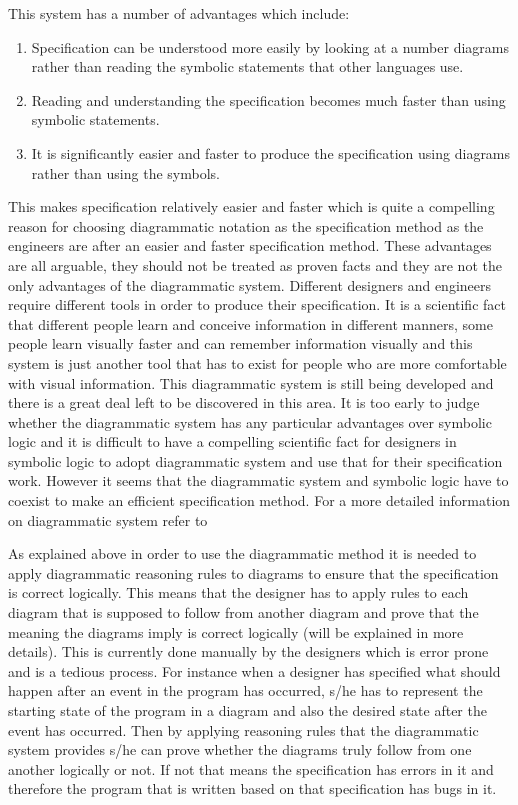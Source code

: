 \documentclass[a4paper]{article}
\begin{document}
This system has a number of advantages which include:
\begin{enumerate}
\item Specification can be understood more easily by looking at a number diagrams rather than reading the symbolic statements that other languages use.
\item Reading and understanding the specification becomes much faster than using symbolic statements.
\item It is significantly easier and faster to produce the specification using diagrams rather than using the symbols.
\end{enumerate}

This makes specification relatively easier and faster which is quite a compelling reason for choosing diagrammatic notation as the specification method as the engineers are after an easier and faster specification method. These advantages are all arguable, they should not be treated as proven facts and they are not the only advantages of the diagrammatic system. Different designers and engineers require different tools in order to produce their specification. It is a scientific fact that different people learn and conceive information in different manners, some people learn visually faster and can remember information visually and this system is just another tool that has to exist for people who are more comfortable with visual information. This diagrammatic system is still being developed and there is a great deal left to be discovered in this area. It is too early to judge whether the diagrammatic system has any particular advantages over symbolic logic and it is difficult to have a compelling scientific fact for designers in symbolic logic to adopt diagrammatic system and use that for their specification work. However it seems that the diagrammatic system and symbolic logic have to coexist to make an efficient specification method. For a more detailed information on diagrammatic system refer to \cite{Aidan_Gem}
   
As explained above in order to use the diagrammatic method it is needed to apply diagrammatic reasoning rules to diagrams to ensure that the specification is correct logically. This means that the designer has to apply rules to each diagram that is supposed to follow from another diagram and prove that the meaning the diagrams imply is correct logically (will be explained in more details). This is currently done manually by the designers which is error prone and is a tedious process. For instance when a designer has specified what should happen after an event in the program has occurred, s/he has to represent the starting state of the program in a diagram and also the desired state after the event has occurred. Then by applying reasoning rules that the diagrammatic system provides s/he can prove whether the diagrams truly follow from one another logically or not. If not that means the specification has errors in it and therefore the program that is written based on that specification has bugs in it.
\end{document}
